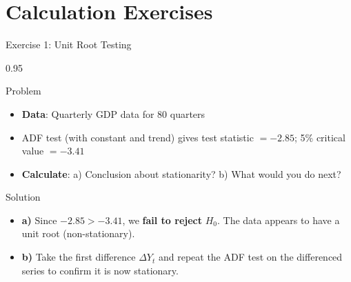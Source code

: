 \documentclass[9pt, aspectratio=169, t]{beamer}
\begin{document}
\section{Calculation Exercises}

\begin{frame}{Exercise 1: Unit Root Testing}
    \begin{cminipage}{0.95\textwidth}
    \begin{alertblock}{Problem}
        \begin{itemize}\setlength{\itemsep}{0pt}
            \item \textbf{Data}: Quarterly GDP data for 80 quarters
            \item ADF test (with constant and trend) gives test statistic $= -2.85$; 5\% critical value $= -3.41$
            \item \textbf{Calculate}: a) Conclusion about stationarity? b) What would you do next?
        \end{itemize}
    \end{alertblock}

    \vspace{0.2cm}
    \begin{exampleblock}{Solution}
        \begin{itemize}\setlength{\itemsep}{0pt}
            \item \textbf{a)} Since $-2.85 > -3.41$, we \textbf{fail to reject} $H_0$. The data appears to have a unit root (non-stationary).
            \item \textbf{b)} Take the first difference $\Delta Y_t$ and repeat the ADF test on the differenced series to confirm it is now stationary.
        \end{itemize}
    \end{exampleblock}
    \end{cminipage}
\end{frame}
\end{document}
